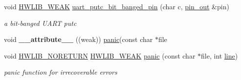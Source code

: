 \begin{DoxyCompactItemize}
void \hyperlink{hwlib-defines_8hpp_a04be4340016df60d6636c1d1c6d94fc9}{H\+W\+L\+I\+B\+\_\+\+W\+E\+AK} \hyperlink{namespacehwlib_a10ed5b50cabfea49044e22331ac6f284}{uart\+\_\+putc\+\_\+bit\+\_\+banged\+\_\+pin} (char c, \hyperlink{classhwlib_1_1pin__out}{pin\+\_\+out} \&pin)
\begin{DoxyCompactList}\small\item\em a bit-\/banged U\+A\+RT putc \end{DoxyCompactList}\item 
void {\bfseries \+\_\+\+\_\+attribute\+\_\+\+\_\+} ((weak)) \hyperlink{namespacehwlib_adc07d80c1eeeabf8c96b6acbd5dce78f}{panic}(const char $\ast$file\hypertarget{namespacehwlib_a6a24122eb10e075b9bb82755a2ecd525}{}\label{namespacehwlib_a6a24122eb10e075b9bb82755a2ecd525}

\item 
void \hyperlink{hwlib-defines_8hpp_aef311f1f416fdcbd1fa22376dcc01029}{H\+W\+L\+I\+B\+\_\+\+N\+O\+R\+E\+T\+U\+RN} \hyperlink{hwlib-defines_8hpp_a04be4340016df60d6636c1d1c6d94fc9}{H\+W\+L\+I\+B\+\_\+\+W\+E\+AK} \hyperlink{namespacehwlib_adc07d80c1eeeabf8c96b6acbd5dce78f}{panic} (const char $\ast$file, int \hyperlink{classhwlib_1_1line}{line})
\begin{DoxyCompactList}\small\item\em panic function for irrecoverable errors \end{DoxyCompactList}\end{DoxyCompactItemize}
